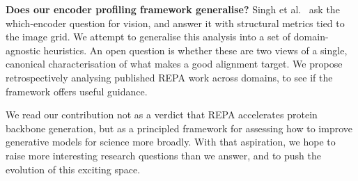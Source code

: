 \documentclass[12pt,a4paper,twoside]{report}
\begin{document}
\textbf{Does our encoder profiling framework generalise?} Singh et al.~\cite{SpatialStructure} ask the which-encoder question for vision, and answer it with structural metrics tied to the image grid. We attempt to generalise this analysis into a set of domain-agnostic heuristics. An open question is whether these are two views of a single, canonical characterisation of what makes a good alignment target. We propose retrospectively analysing published REPA work across domains, to see if the framework offers useful guidance.

We read our contribution not as a verdict that REPA accelerates protein backbone generation, but as a principled framework for assessing how to improve generative models for science more broadly. With that aspiration, we hope to raise more interesting research questions than we answer, and to push the evolution of this exciting space.

\label{lastcontentpage} %

\end{document}
